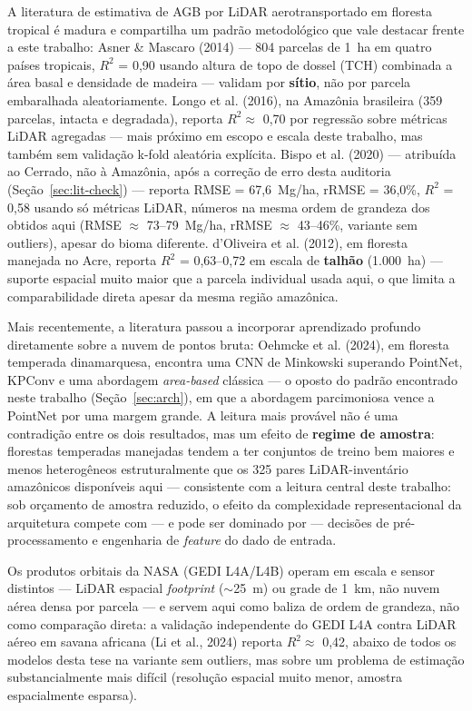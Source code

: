 A literatura de estimativa de AGB por LiDAR aerotransportado em floresta tropical
é madura e compartilha um padrão metodológico que vale destacar frente a este
trabalho: Asner \& Mascaro (2014) --- 804 parcelas de 1~ha em quatro países
tropicais, $R^2$ = 0,90 usando altura de topo de dossel (TCH) combinada a área
basal e densidade de madeira --- validam por \textbf{sítio}, não por parcela
embaralhada aleatoriamente. Longo et al. (2016), na Amazônia brasileira (359
parcelas, intacta e degradada), reporta $R^2 \approx$ 0,70 por regressão sobre
métricas LiDAR agregadas --- mais próximo em escopo e escala deste trabalho, mas
também sem validação k-fold aleatória explícita. Bispo et al. (2020) --- atribuída
ao Cerrado, não à Amazônia, após a correção de erro desta auditoria
(Seção~\ref{sec:lit-check}) --- reporta RMSE = 67,6~Mg/ha, rRMSE = 36,0\%,
$R^2$ = 0,58 usando só métricas LiDAR, números na mesma ordem de grandeza dos
obtidos aqui (RMSE $\approx$ 73--79~Mg/ha, rRMSE $\approx$ 43--46\%, variante sem
outliers), apesar do bioma diferente. d'Oliveira et al. (2012), em floresta
manejada no Acre, reporta $R^2$ = 0,63--0,72 em escala de \textbf{talhão}
(1.000~ha) --- suporte espacial muito maior que a parcela individual usada aqui,
o que limita a comparabilidade direta apesar da mesma região amazônica.

Mais recentemente, a literatura passou a incorporar aprendizado profundo
diretamente sobre a nuvem de pontos bruta: Oehmcke et al. (2024), em floresta
temperada dinamarquesa, encontra uma CNN de Minkowski superando PointNet, KPConv
e uma abordagem \textit{area-based} clássica --- o oposto do padrão encontrado
neste trabalho (Seção~\ref{sec:arch}), em que a abordagem parcimoniosa vence a
PointNet por uma margem grande. A leitura mais provável não é uma contradição
entre os dois resultados, mas um efeito de \textbf{regime de amostra}: florestas
temperadas manejadas tendem a ter conjuntos de treino bem maiores e menos
heterogêneos estruturalmente que os 325 pares LiDAR-inventário amazônicos
disponíveis aqui --- consistente com a leitura central deste trabalho: sob
orçamento de amostra reduzido, o efeito da complexidade representacional da
arquitetura compete com --- e pode ser dominado por --- decisões de
pré-processamento e engenharia de \textit{feature} do dado de entrada.

Os produtos orbitais da NASA (GEDI L4A/L4B) operam em escala e sensor distintos
--- LiDAR espacial \textit{footprint} ($\sim$25~m) ou grade de 1~km, não nuvem
aérea densa por parcela --- e servem aqui como baliza de ordem de grandeza, não
como comparação direta: a validação independente do GEDI L4A contra LiDAR aéreo
em savana africana (Li et al., 2024) reporta $R^2 \approx$ 0,42, abaixo de todos
os modelos desta tese na variante sem outliers, mas sobre um problema de
estimação substancialmente mais difícil (resolução espacial muito menor, amostra
espacialmente esparsa).

